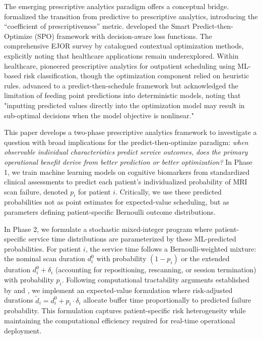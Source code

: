 \documentclass[msom,blindrev]{informs3}
\begin{document}
The emerging prescriptive analytics paradigm offers a conceptual bridge. \citet{bertsimas2020predictive} formalized the transition from predictive to prescriptive analytics, introducing the ``coefficient of prescriptiveness'' metric. \citet{elmachtoub2022smart} developed the Smart Predict-then-Optimize (SPO) framework with decision-aware loss functions. The comprehensive EJOR survey by \citet{sadana2025contextual} catalogued contextual optimization methods, explicitly noting that healthcare applications remain underexplored. Within healthcare, \citet{srinivas2018prescriptive} pioneered prescriptive analytics for outpatient scheduling using ML-based risk classification, though the optimization component relied on heuristic rules. \citet{salah2022predict} advanced to a predict-then-schedule framework but acknowledged the limitation of feeding point predictions into deterministic models, noting that "inputting predicted values directly into the optimization model may result in sub-optimal decisions when the model objective is nonlinear."

This paper develops a two-phase prescriptive analytics framework to investigate a question with broad implications for the predict-then-optimize paradigm: \textit{when observable individual characteristics predict service outcomes, does the primary operational benefit derive from better prediction or better optimization?} In Phase 1, we train machine learning models on cognitive biomarkers from standardized clinical assessments to predict each patient's individualized probability of MRI scan failure, denoted $p_i$ for patient $i$. Critically, we use these predicted probabilities not as point estimates for expected-value scheduling, but as parameters defining patient-specific Bernoulli outcome distributions.

In Phase 2, we formulate a stochastic mixed-integer program where patient-specific service time distributions are parameterized by these ML-predicted probabilities. For patient $i$, the service time follows a Bernoulli-weighted mixture: the nominal scan duration $d_i^0$ with probability $(1-p_i)$ or the extended duration $d_i^0 + \delta_i$ (accounting for repositioning, rescanning, or session termination) with probability $p_i$. Following computational tractability arguments established by \citet{denton2003sequential} and \citet{mancilla2012sample}, we implement an expected-value formulation where risk-adjusted durations $\tilde{d}_i = d_i^0 + p_i \cdot \delta_i$ allocate buffer time proportionally to predicted failure probability. This formulation captures patient-specific risk heterogeneity while maintaining the computational efficiency required for real-time operational deployment.
\end{document}
